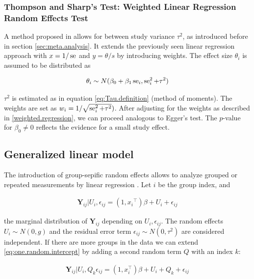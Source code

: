 \documentclass[11pt,a4paper,twoside]{book}\usepackage[]{graphicx}\usepackage[]{color}
\begin{document}
\subsubsection{Thompson and Sharp's Test: Weighted Linear Regression Random Effects Test} \label{sec:Thompson}
A method proposed in \citet{thompson.sharp} allows for between study variance $\tau^2$, as introduced before in section \ref{sec:meta.analysis}. It extends the previously seen linear regression approach with $x = 1/\operatorname{se}$ and $y = \theta/s$ by introducing weights. The effect size $\theta_i$ is assumed to be distributed as

\begin{align}
\theta_i \sim N(\beta_0 + \beta_1 \operatorname{se}_i, \operatorname{se}_i^2 + \tau^2) \label{t.sharp.regression}
\end{align}

$\tau^2$ is estimated as in equation \ref{eq:Tau.definition} (method of moments). %
The weights are set as $w_i = 1/\sqrt{\operatorname{se}_i^2 + \tau^2})$. After adjusting for the weights as described in \ref{weighted.regression}, we can proceed analogous to Egger's test. The $p$-value for $\beta_{0} \neq 0$ reflects the evidence for a small study effect.

\subsection{Generalized linear model} \label{random.intecepts}
The introduction of group-sepific random effects allows to analyze grouped or repeated measurements by linear regression \citep{Glm}. Let $i$ be the group index, and

\begin{align}
\mathbf{Y}{_{ij}}|U{_i},\epsilon{_{ij}} = (1,x{_i}^\top)\beta + U{_i} + \epsilon{_{ij}} \label{eq:one.random.intercept}
\end{align}

the marginal distribution of $\mathbf{Y}{_{ij}}$ depending on $U{_i},\epsilon{_{ij}}$. The random effects $U{_i} \sim N(0, g)$ and the residual error term $\epsilon{_{ij}} \sim N(0, \tau^{2})$ are considered independent. If there are more groups in the data we can extend \eqref{eq:one.random.intercept} by adding a second random term $Q$ with an index $k$:

\begin{align}
\mathbf{Y}{_{ij}}|U_i, Q_k \epsilon{_{ij}} = (1,x_i^\top)\beta + U_i + Q_k + \epsilon{_{ij}} \label{eq:two.random.intercepts}
\end{align}
\end{document}
